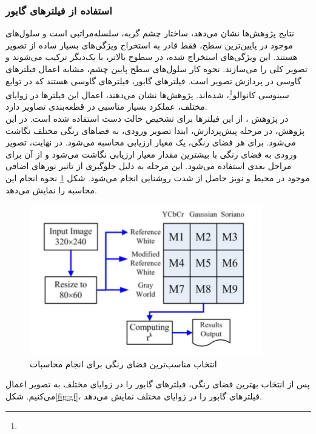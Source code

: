 \documentclass[11.5pt,a4paper]{article}
\newcommand{\enfootnote}[1]{\footnote{\lr{#1}}}
\begin{document}
\subsubsection{استفاده از فیلترهای گابور}	
نتایج پژوهش‌ها نشان می‌دهد، ساختار چشم گربه، سلسله‌مراتبی است و سلول‌های موجود در پایین‌ترین سطح، فقط قادر به استخراج ویژگی‌های بسیار ساده از تصویر هستند. این ویژگی‌های استخراج شده، در سطوح بالاتر، با یک‌دیگر ترکیب می‌شوند و تصویر کلی را می‌سازند. نحوه کار سلول‌های سطح پایین چشم، مشابه اعمال فیلترهای گاوسی در پردازش تصویر است. فیلترهای گابور، فیلترهای گاوسی هستند که در توابع سینوسی کانوالو\enfootnote{Convolve}، شده‌اند. پژوهش‌ها نشان می‌دهند، اعمال این فیلترها در زوایای مختلف، عملکرد بسیار مناسبی در قطعه‌بندی تصاویر دارد.
\\
در پژوهش \cite{huang2011gabor}، از این فیلترها برای تشخیص حالت دست استفاده شده است. در این پژوهش، در مرحله پیش‌پردازش، ابتدا تصویر ورودی، به فضاهای رنگی مختلف نگاشت می‌شود. برای هر فضای رنگی، یک معیار ارزیابی محاسبه می‌شود. در نهایت، تصویر ورودی به فضای رنگی با بیشترین مقدار معیار ارزیابی نگاشت می‌شود و از آن برای مراحل بعدی استفاده می‌شود. این مرحله به دلیل جلوگیری از تاثیر نورهای اضافی موجود در محیط و نویز حاصل از شدت روشنایی انجام می‌شود.
شکل \ref{fig:hpg1} نحوه انجام این محاسبه را نمایش می‌دهد. 

\begin{figure}[h]
\center
\includegraphics[scale=0.4]{Imgs/hpg1.png}
\caption{انتخاب مناسب‌ترین فضای رنگی برای انجام محاسبات \cite{huang2011gabor}}
\label{fig:hpg1}
\end{figure}

پس از انتخاب بهترین فضای رنگی، فیلترهای گابور را در زوایای مختلف به تصویر اعمال می‌کنیم. شکل\ref{fig:gf}، فیلترهای گابور را در زوایای مختلف نمایش می‌دهد.
\end{document}
